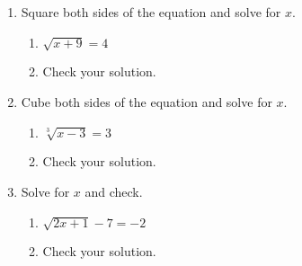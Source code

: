 \documentclass[12pt, twoside]{article}
\begin{document}
\begin{enumerate}
\newpage 
\item Square both sides of the equation and solve for $x$.
    \begin{multicols}{2}
    \begin{enumerate}[itemsep=0.5cm]
        \item  $\sqrt{x+9}=4$
        \item Check your solution.
    \end{enumerate}
    \end{multicols} \vspace{3cm}

\item Cube both sides of the equation and solve for $x$.
    \begin{multicols}{2}
    \begin{enumerate}[itemsep=0.5cm]
        \item  $\sqrt[3]{x-3}=3$
        \item Check your solution.
    \end{enumerate}
    \end{multicols} \vspace{4cm}

\item Solve for $x$ and check.
    \begin{multicols}{2}
    \begin{enumerate}[itemsep=0.5cm]
        \item  $\sqrt{2x+1} - 7 = -2$
        \item Check your solution.
    \end{enumerate}
    \end{multicols} \vspace{3cm}

\end{enumerate}
\end{document}
